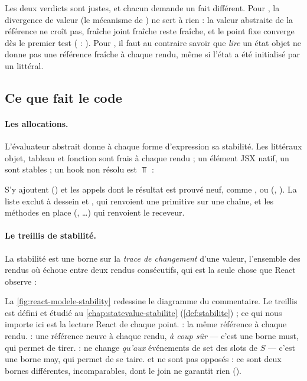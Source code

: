 Les deux verdicts sont justes, et chacun demande un fait différent. Pour
, la divergence de valeur (le mécanisme de ) ne sert à
rien : la valeur abstraite de la référence ne croît pas, \og fraîche\fg{} joint
\og fraîche\fg{} reste \og fraîche\fg{}, et le point fixe converge dès
le premier test ( : ). Pour , il faut au contraire savoir que
\emph{lire} un état objet ne donne pas une référence fraîche à chaque rendu,
même si l'état a été initialisé par un littéral.

\subsection{Ce que fait le code}

\paragraph{Les allocations.} L'évaluateur abstrait donne à chaque forme
d'expression sa stabilité. Les littéraux objet, tableau et fonction sont frais
à chaque rendu ; un élément JSX natif, un  sont stables ; un hook
non résolu est $\Top$ :


S'y ajoutent  ()
et les appels dont le résultat est prouvé neuf, comme , 
ou  (,
). La liste exclut à dessein
 et , qui renvoient une primitive sur une chaîne, et
les méthodes en place (, \dots) qui renvoient le
receveur.

\paragraph{Le treillis de stabilité.} La stabilité est une borne sur la
\emph{trace de changement} d'une valeur, l'ensemble des rendus où
 échoue entre deux rendus consécutifs, qui est la seule chose
que React observe :


La \cref{fig:react-modele-stability} redessine le diagramme du commentaire. Le
treillis est défini et étudié au \cref{chap:statevalue-stabilite}
(\cref{def:stabilite}) ; ce qui nous importe ici est la lecture React
de chaque point.  : la même référence à chaque rendu.
 : une référence neuve à chaque rendu, \emph{à coup sûr} ---
c'est une borne must, qui permet de tirer.  : ne change
\emph{qu'aux} événements de set des slots de $S$ --- c'est une borne may, qui
permet de se taire.  et  ne sont pas opposés :
ce sont deux bornes différentes, incomparables, dont le join ne garantit rien
().

